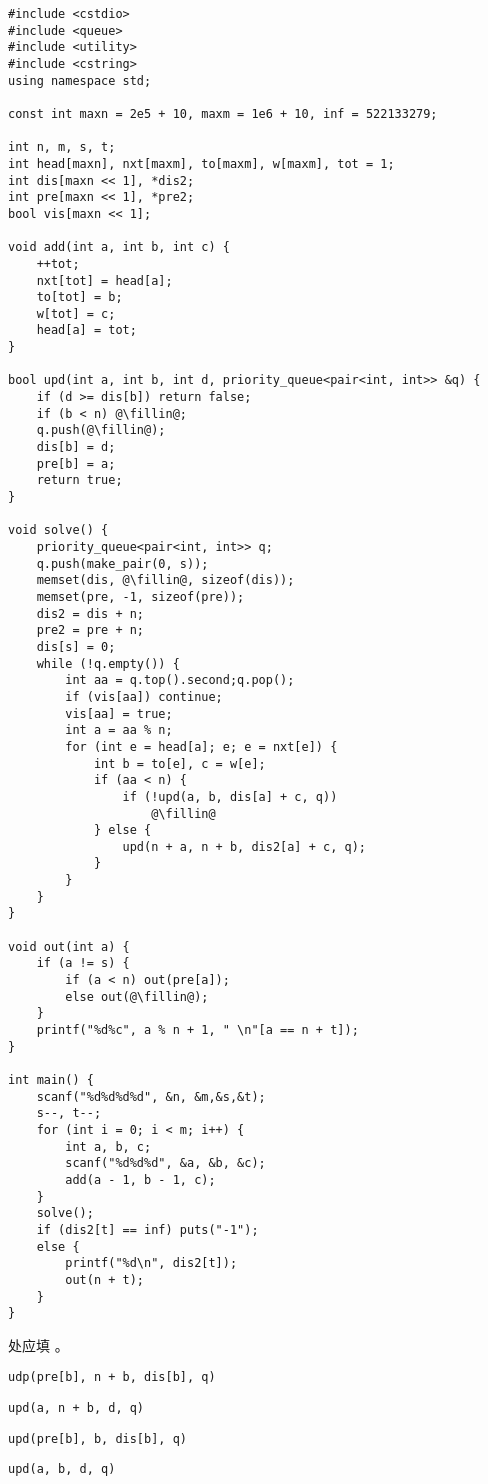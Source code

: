 \documentclass{exam-zh}
\newcommand{\code}[1]{\texttt{#1}}
\begin{document}
\begin{lstlisting}[escapechar=\@]
#include <cstdio>
#include <queue>
#include <utility>
#include <cstring>
using namespace std;

const int maxn = 2e5 + 10, maxm = 1e6 + 10, inf = 522133279;

int n, m, s, t;
int head[maxn], nxt[maxm], to[maxm], w[maxm], tot = 1;
int dis[maxn << 1], *dis2;
int pre[maxn << 1], *pre2;
bool vis[maxn << 1];

void add(int a, int b, int c) {
    ++tot;
    nxt[tot] = head[a];
    to[tot] = b;
    w[tot] = c;
    head[a] = tot;
}

bool upd(int a, int b, int d, priority_queue<pair<int, int>> &q) {
    if (d >= dis[b]) return false;
    if (b < n) @\fillin@;
    q.push(@\fillin@);
    dis[b] = d;
    pre[b] = a;
    return true;
}

void solve() {
    priority_queue<pair<int, int>> q;
    q.push(make_pair(0, s));
    memset(dis, @\fillin@, sizeof(dis));
    memset(pre, -1, sizeof(pre));
    dis2 = dis + n;
    pre2 = pre + n;
    dis[s] = 0;
    while (!q.empty()) {
        int aa = q.top().second;q.pop();
        if (vis[aa]) continue;
        vis[aa] = true;
        int a = aa % n;
        for (int e = head[a]; e; e = nxt[e]) {
            int b = to[e], c = w[e];
            if (aa < n) {
                if (!upd(a, b, dis[a] + c, q))
                    @\fillin@
            } else {
                upd(n + a, n + b, dis2[a] + c, q);
            }
        }
    }
}

void out(int a) {
    if (a != s) {
        if (a < n) out(pre[a]);
        else out(@\fillin@);
    }
    printf("%d%c", a % n + 1, " \n"[a == n + t]);
}

int main() {
    scanf("%d%d%d%d", &n, &m,&s,&t);
    s--, t--;
    for (int i = 0; i < m; i++) {
        int a, b, c;
        scanf("%d%d%d", &a, &b, &c);
        add(a - 1, b - 1, c);
    }
    solve();
    if (dis2[t] == inf) puts("-1");
    else {
        printf("%d\n", dis2[t]);
        out(n + t);
    }
}
\end{lstlisting}

\begin{solution}

\end{solution}

\begin{question}
     处应填 \paren[A]。
    \begin{choices}
        \item \code{udp(pre[b], n + b, dis[b], q)}
        \item \code{upd(a, n + b, d, q)}
        \item \code{upd(pre[b], b, dis[b], q)}
        \item \code{upd(a, b, d, q)}
    \end{choices}
\end{question}
\end{document}
